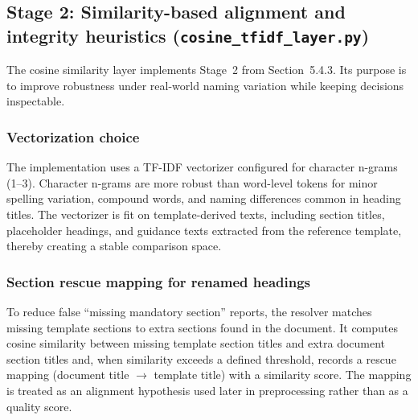 \subsection{Stage 2: Similarity-based alignment and integrity heuristics (\texttt{cosine\_tfidf\_layer.py})}
The cosine similarity layer implements Stage~2 from Section~5.4.3. Its purpose is to improve robustness under real-world naming variation while keeping decisions inspectable.

\subsubsection{Vectorization choice}
The implementation uses a TF-IDF vectorizer configured for character n-grams (1--3). Character n-grams are more robust than word-level tokens for minor spelling variation, compound words, and naming differences common in heading titles. The vectorizer is fit on template-derived texts, including section titles, placeholder headings, and guidance texts extracted from the reference template, thereby creating a stable comparison space.

\subsubsection{Section rescue mapping for renamed headings}
To reduce false ``missing mandatory section'' reports, the resolver matches missing template sections to extra sections found in the document. It computes cosine similarity between missing template section titles and extra document section titles and, when similarity exceeds a defined threshold, records a rescue mapping (document title $\rightarrow$ template title) with a similarity score. The mapping is treated as an alignment hypothesis used later in preprocessing rather than as a quality score.

